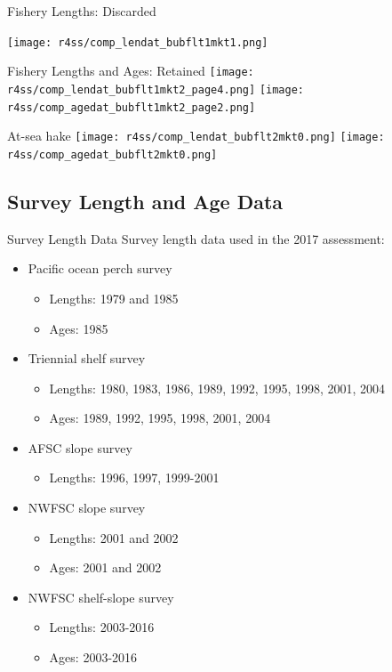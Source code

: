 \documentclass[pdf]{beamer}\usepackage[]{graphicx}\usepackage[]{color}
\begin{document}
\begin{frame}{Fishery Lengths: Discarded}
   \begin{center}
   \texttt{[image: r4ss/comp\_lendat\_bubflt1mkt1.png]}
   \end{center}
\end{frame}

\begin{frame}{Fishery Lengths and Ages: Retained}
   \texttt{[image: r4ss/comp\_lendat\_bubflt1mkt2\_page4.png]}
   \texttt{[image: r4ss/comp\_agedat\_bubflt1mkt2\_page2.png]}
\end{frame}


\begin{frame}{At-sea hake}
  \texttt{[image: r4ss/comp\_lendat\_bubflt2mkt0.png]}
  \texttt{[image: r4ss/comp\_agedat\_bubflt2mkt0.png]}
\end{frame}

\subsection{Survey Length and Age Data}
\begin{frame}{Survey Length Data}
  Survey length data used in the 2017 assessment:
  \begin{itemize}
    \item Pacific ocean perch survey
      \begin{itemize}
        \item Lengths: 1979 and 1985
        \item Ages: 1985
      \end{itemize}
    \item Triennial shelf survey
      \begin{itemize}
        \item Lengths: 1980, 1983, 1986, 1989, 1992, 1995, 1998, 2001, 2004
        \item Ages: 1989, 1992, 1995, 1998, 2001, 2004
      \end{itemize}
    \item AFSC slope survey
      \begin{itemize}
        \item Lengths: 1996, 1997, 1999-2001
      \end{itemize}
    \item NWFSC slope survey
      \begin{itemize}
        \item Lengths: 2001 and 2002
        \item Ages: 2001 and 2002
      \end{itemize}
    \item NWFSC shelf-slope survey
      \begin{itemize}
        \item Lengths: 2003-2016
        \item Ages: 2003-2016
      \end{itemize}
  \end{itemize}
\end{frame}
\end{document}
